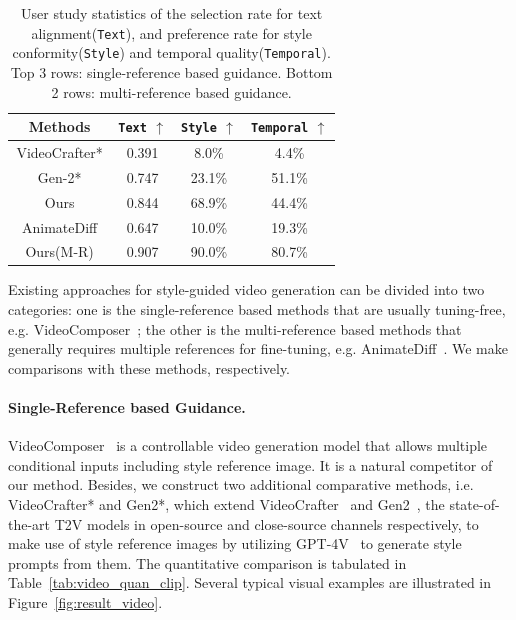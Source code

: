 \begin{table}[!t]
\centering

\caption{User study statistics of the selection rate for text alignment(\texttt{Text}), and preference rate for style conformity(\texttt{Style}) and temporal quality(\texttt{Temporal}). Top 3 rows: single-reference based guidance. Bottom 2 rows: multi-reference based guidance.}
\label{tab:video_quan_multi_ref}
\vspace{-1em}

\small
\begin{tabular}{c c c c} %
    \toprule
    Methods & \texttt{Text} $\uparrow$ & \texttt{Style} $\uparrow$ & \texttt{Temporal} $\uparrow$ \\
    \midrule
    VideoCrafter* & 0.391 & 8.0\% & 4.4\%  \\
    Gen-2* & 0.747 & 23.1\% & 51.1\% \\
    Ours & 0.844 & 68.9\% & 44.4\% \\
    \midrule
    ~AnimateDiff~ & 0.647 & 10.0\% & 19.3\% \\
    Ours(M-R) & 0.907 & 90.0\% & 80.7\% \\
    \bottomrule
\end{tabular}
\end{table}

Existing approaches for style-guided video generation can be divided into two categories: one is the single-reference based methods that are usually tuning-free, e.g. VideoComposer~\cite{wang2024videocomposer}; the other is the multi-reference based methods that generally requires multiple references for fine-tuning, e.g. AnimateDiff~\cite{guo2023animatediff}. We make comparisons with these methods, respectively. 


\vspace{-0.5em}
\paragraph{Single-Reference based Guidance.}VideoComposer~\cite{wang2024videocomposer} is a controllable video generation model that allows multiple conditional inputs including style reference image. It is a natural competitor of our method. 
Besides, we construct two additional comparative methods, i.e. VideoCrafter* and Gen2*, which extend VideoCrafter~\cite{chen2023videocrafter} and Gen2~\cite{Gen-2}, the state-of-the-art T2V models in open-source and close-source channels respectively, to make use of style reference images by utilizing GPT-4V~\cite{openai2023gpt4v} to generate style prompts from them.
The quantitative comparison is tabulated in Table~\ref{tab:video_quan_clip}. Several typical visual examples are illustrated in Figure~\ref{fig:result_video}.

